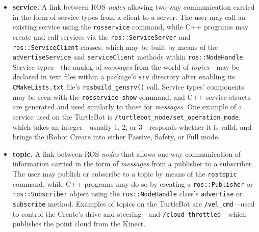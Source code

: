 \documentclass[12pt]{report}
\begin{document}
\begin{itemize}
\item{\textbf{service.} A link between ROS \textit{nodes} allowing two-way communication carried in the form of service types from a client to a server.  The user may call an existing service using the \texttt{rosservice} command, while C++ programs may create and call services via the \texttt{ros::ServiceServer} and \texttt{ros::ServiceClient} classes, which may be built by means of the \texttt{advertiseService} and \texttt{serviceClient} methods within \texttt{ros::NodeHandle}.  Service types---the analog of \textit{messages} from the world of \textit{topics}---may be declared in text files within a package's \texttt{srv} directory after enabling its \texttt{CMakeLists.txt} file's \texttt{rosbuild\_gensrv()} call.  Service types' components may be seen with the \texttt{rosservice show} command, and C++ service structs are generated and used similarly to those for \textit{messages}.  One example of a service used on the TurtleBot is \texttt{/turtlebot\_node/set\_operation\_mode}, which takes an integer---usually 1, 2, or 3---responds whether it is valid, and brings the iRobot Create into either Passive, Safety, or Full mode.}
\item{\textbf{topic.} A link between ROS \textit{nodes} that allows one-way communication of information carried in the form of \textit{messages} from a publisher to a subscriber.  The user may publish or subscribe to a topic by means of the \texttt{rostopic} command, while C++ programs may do so by creating a \texttt{ros::Publisher} or \texttt{ros::Subscriber} object using the \texttt{ros::NodeHandle} class's \texttt{advertise} or \texttt{subscribe} method.  Examples of topics on the TurtleBot are \texttt{/vel\_cmd}---used to control the Create's drive and steering---and \texttt{/cloud\_throttled}---which publishes the point cloud from the Kinect.}
\end{itemize}
\end{document}
